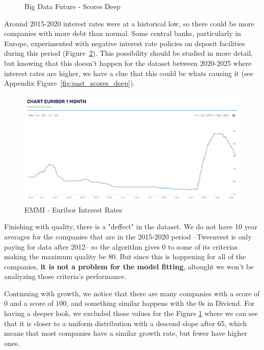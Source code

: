 \documentclass[11pt,english,a4paper,hidelinks]{book}
\begin{document}
\begin{figure}[H]
\begin{minipage}{0.48\textwidth}
        \caption{Big Data Future - Scores Deep}
        \label{fig:scores_deep}
    \end{minipage}
\end{figure}

\noindent Around 2015-2020 interest rates were at a historical low, so there could be more companies with more debt than normal. Some central banks, particularly in Europe, experimented with negative interest rate policies on deposit facilities during this period (Figure~\ref{fig:euribor}). This possibility should be studied in more detail, but knowing that this doesn't happen for the dataset between 2020-2025 where interest rates are higher, we have a clue that this could be whats causing it (see Appendix Figure~\ref{fig:past_scores_deep}).


\begin{figure}[H]
    \centering
    \includegraphics[width=1\linewidth]{images/macros/Euribor.png}
    \caption{EMMI - Euribor Interest Rates}
    \label{fig:euribor}
\end{figure}



\vspace{0.5cm}
\noindent Finishing with quality, there is a "deffect" in the dataset. We do not have 10 year averages for the companies that are in the 2015-2020 period --Tweenvest is only paying for data after 2012-- so the algorithm gives 0 to some of its criterias making the maximum quality be 80. But since this is happening for all of the companies, \textbf{it is not a problem for the model fitting}, altought we won't be analiyzing those criteria's performance.

\vspace{0.5cm}
\noindent Continuing with growth, we notice that there are many companies with a score of 0 and a score of 100, and something similar happens with the 0s in Diviend. For having a deeper look, we excluded those values for the Figure \ref{fig:scores_deep} where we can see that it is closer to a uniform distribution with a descend slope after 65, which means that most companies have a similar growth rate, but fewer have higher ones.
\end{document}
